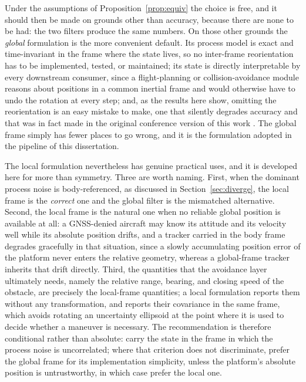 Under the assumptions of Proposition~\ref{prop:equiv} the choice is free, and it
should then be made on grounds other than accuracy, because there are none to be
had: the two filters produce the same numbers. On those other grounds the
\emph{global} formulation is the more convenient default. Its process model is
exact and time-invariant in the frame where the state lives, so no inter-frame
reorientation has to be implemented, tested, or maintained; its state is directly
interpretable by every downstream consumer, since a flight-planning or
collision-avoidance module reasons about positions in a common inertial frame and
would otherwise have to undo the rotation at every step; and, as the results here
show, omitting the reorientation is an easy mistake to make, one that silently
degrades accuracy and that was in fact made in the original conference
version of this work . The global frame simply has fewer
places to go wrong, and it is the formulation adopted in the pipeline of this
dissertation.

The local formulation nevertheless has genuine practical uses, and it is developed
here for more than symmetry. Three are worth naming. First, when the dominant
process noise is body-referenced, as discussed in Section~\ref{sec:diverge}, the
local frame is the \emph{correct} one and the global filter is the mismatched
alternative. Second, the local frame is the natural one when no reliable global
position is available at all: a GNSS-denied aircraft may know its attitude and its
velocity well while its absolute position drifts, and a tracker carried in the
body frame degrades gracefully in that situation, since a slowly accumulating
position error of the platform never enters the relative geometry, whereas a
global-frame tracker inherits that drift directly. Third, the quantities that the
avoidance layer ultimately needs, namely the relative range, bearing, and closing
speed of the obstacle, are precisely the local-frame quantities; a local
formulation reports them without any transformation, and reports their covariance
in the same frame, which avoids rotating an uncertainty ellipsoid at the point
where it is used to decide whether a maneuver is necessary. The recommendation is
therefore conditional rather than absolute: carry the state in the frame in which
the process noise is uncorrelated; where that criterion does not discriminate,
prefer the global frame for its implementation simplicity, unless the platform's
absolute position is untrustworthy, in which case prefer the local one.

